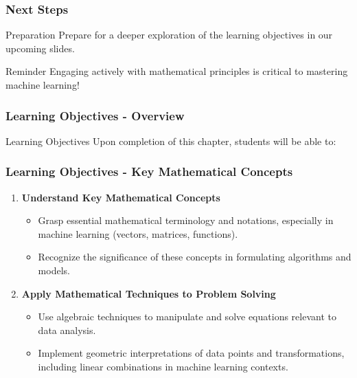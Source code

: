\documentclass[aspectratio=169]{beamer}
\begin{document}
\begin{frame}[fragile]
    \frametitle{Next Steps}
    \begin{block}{Preparation}
        Prepare for a deeper exploration of the learning objectives in our upcoming slides.
    \end{block}
    
    \begin{block}{Reminder}
        Engaging actively with mathematical principles is critical to mastering machine learning!
    \end{block}
\end{frame}

\begin{frame}[fragile]
    \frametitle{Learning Objectives - Overview}
    \begin{block}{Learning Objectives}
        Upon completion of this chapter, students will be able to:
    \end{block}
\end{frame}

\begin{frame}[fragile]
    \frametitle{Learning Objectives - Key Mathematical Concepts}
    \begin{enumerate}
        \item \textbf{Understand Key Mathematical Concepts}
        \begin{itemize}
            \item Grasp essential mathematical terminology and notations, especially in machine learning (vectors, matrices, functions).
            \item Recognize the significance of these concepts in formulating algorithms and models.
        \end{itemize}
        
        \item \textbf{Apply Mathematical Techniques to Problem Solving}
        \begin{itemize}
            \item Use algebraic techniques to manipulate and solve equations relevant to data analysis.
            \item Implement geometric interpretations of data points and transformations, including linear combinations in machine learning contexts.
        \end{itemize}
    \end{enumerate}
\end{frame}
\end{document}
